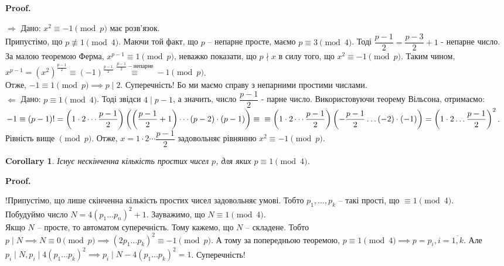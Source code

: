 \documentclass[a4paper, 10pt]{article}
\makeatletter
\theoremstyle{theoremdd}
\theoremstyle{theoremdd}
\theoremstyle{theoremdd}
\theoremstyle{theoremdd}
\theoremstyle{theoremdd}
\theoremstyle{theoremdd}
\theoremstyle{theoremdd}
\theoremstyle{theoremdd}
\newtheorem{corollary}[theorem]{Corollary}
\def\rightproof{$\boxed{\Rightarrow}$ }
\def\leftproof{$\boxed{\Leftarrow}$ }
\renewenvironment{proof}[1][Proof.\\]{\par
\pushQED{\hfill \qed}%
\normalfont \topsep6\p@\@plus6\p@\relax
\trivlist
\item\relax
{\bfseries
#1\@addpunct{.}}\hspace\labelsep\ignorespaces
}{%
\popQED\endtrivlist\@endpefalse
}
\makeatother
\begin{document}
\begin{proof}
\rightproof Дано: $x^2 \equiv -1 \pmod p$ має розв'язок.\\
Припустімо, що $p \not\equiv 1 \pmod 4$. Маючи той факт, що $p$ -- непарне просте, маємо $p \equiv 3 \pmod 4$. Тоді $\dfrac{p-1}{2} = \dfrac{p-3}{2} + 1$ - непарне число.\\
За малою теоремою Ферма, $x^{p-1} \equiv 1 \pmod p$, неважко показати, що $p \nmid x$ в силу того, що $x^2 \equiv -1 \pmod p$. Таким чином,\\
$x^{p-1} = \left( x^2 \right)^{\frac{p-1}{2}} \equiv (-1)^{\frac{p-1}{2}} \overset{\frac{p-1}{2} - \text{непарне}}{\equiv} -1 \pmod p$.\\
Отже, $-1 \equiv 1 \pmod p \implies p \mid 2$. Суперечність! Бо ми маємо справу з непарними простими числами.
\bigskip \\
\leftproof Дано: $p \equiv 1 \pmod 4$. Тоді звідси $4 \mid p-1$, а значить, число $\dfrac{p-1}{2}$ - парне число. Використовуючи теорему Вільсона, отримаємо:\\
$-1 \equiv (p-1)! = \left( 1 \cdot 2 \cdots \dfrac{p-1}{2} \right) \left( \left(\dfrac{p-1}{2}+1 \right) \cdots (p-2) \cdot (p-1) \right) \equiv \\
\equiv \left(1 \cdot 2 \cdots \dfrac{p-1}{2} \right) \left( -\dfrac{p-1}{2} \dots (-2) \cdot (-1) \right) = \left(1 \cdot 2 \dots \dfrac{p-1}{2} \right)^2$.\\
Рівність вище $\pmod p$. Отже, $x = 1 \cdot 2 \cdots \dfrac{p-1}{2}$ задовольняє рівнянню $x^2 \equiv -1 \pmod p$.
\end{proof}

\begin{corollary}
Існує нескінченна кількість простих чисел $p$, для яких $p \equiv 1 \pmod 4$.
\end{corollary}

\begin{proof}
!Припустімо, що лише скінченна кількість простих чисел задовольняє умові. Тобто $p_1,\dots,p_k$ -- такі прості, що $\equiv 1 \pmod 4$.\\
Побудуймо число $N = 4(p_1 \dots p_n)^2 + 1$. Зауважимо, що $N \equiv 1 \pmod 4$.\\
Якщо $N$ -- просте, то автоматом суперечність. Тому кажемо, що $N$ -- складене. Тобто $p \mid N \implies N \equiv 0 \pmod p \implies (2p_1 \dots p_k)^2 \equiv -1 \pmod p$. А тому за попередньою теоремою, $p \equiv 1 \pmod 4 \implies p = p_i, i = \overline{1,k}$. Але $p_i \mid N, p_i \mid 4(p_1 \dots p_k)^2 \implies p_i \mid N - 4(p_1 \dots p_k)^2 = 1$. Суперечність!
\end{proof}
\end{document}
